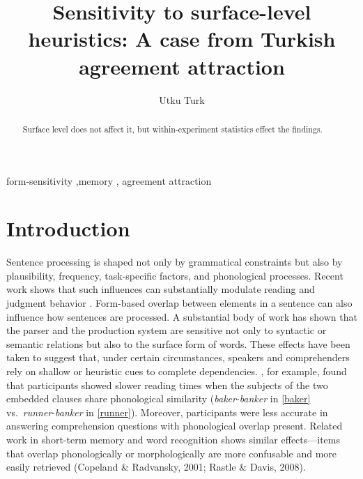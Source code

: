 \documentclass[
  authoryear,
  3p]{elsarticle}
\begin{document}
\begin{frontmatter}
\title{Sensitivity to surface-level heuristics: A case from Turkish
agreement attraction}
\author[1]{Utku Turk%
%
}



        
\begin{abstract}
Surface level does not affect it, but within-experiment statistics
effect the findings.
\end{abstract}





\begin{keyword}
    form-sensitivity \sep memory \sep 
    agreement attraction
\end{keyword}
\end{frontmatter}
    

\section{Introduction}\label{introduction}

Sentence processing is shaped not only by grammatical constraints but
also by plausibility, frequency, task-specific factors, and phonological
processes. Recent work shows that such influences can substantially
modulate reading and judgment behavior
\citep{LauraMalsbug24, ArehalliWittenberg2021, HammerlyEtAl2019, LogacevVasishth2016}.
Form-based overlap between elements in a sentence can also influence how
sentences are processed. A substantial body of work has shown that the
parser and the production system are sensitive not only to syntactic or
semantic relations but also to the surface form of words. These effects
have been taken to suggest that, under certain circumstances, speakers
and comprehenders rely on shallow or heuristic cues to complete
dependencies. \citet{AchesonMacDonald2011}, for example, found that
participants showed slower reading times when the subjects of the two
embedded clauses share phonological similarity
(\emph{baker}-\emph{banker} in \ref{baker}
vs.~\emph{runner}-\emph{banker} in \ref{runner}). Moreover, participants
were less accurate in answering comprehension questions with
phonological overlap present. Related work in short-term memory and word
recognition shows similar effects---items that overlap phonologically or
morphologically are more confusable and more easily retrieved (Copeland
\& Radvansky, 2001; Rastle \& Davis, 2008).
\end{document}
